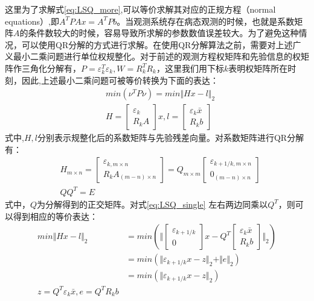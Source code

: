 这里为了求解式\eqref{eq:LSQ_more},可以等价求解其对应的正规方程（normal equations）,即\(A^{T}PAx=A^{T}Pb\)。当观测系统存在病态观测的时候，也就是系数矩阵\(A\)的条件数较大的时候，容易导致所求解的参数数值误差较大。为了避免这种情况，可以使用QR分解的方式进行求解。在使用QR分解算法之前，需要对上述广义最小二乘问题进行单位权规整化。对于前述的观测方程权矩阵和先验信息的权矩阵作三角化分解有，\(P=\varepsilon_{k}^{T}\varepsilon_{k},W=R_{k}^TR_{k}\)，这里我们用下标\(k\)表明权矩阵所在时刻，因此,上述最小二乘问题可被等价转换为下面的表达：
\begin{equation}
	\begin{aligned}
	& min(\nu^{T}P\nu) =min \Vert Hx-l \Vert_{2} \\
	& H = 
	\begin{bmatrix}
		\varepsilon_{k}\\
		R_{k}A 
	\end{bmatrix}x ,
	l = 
	\begin{bmatrix}
		\varepsilon_{k}\bar{x} \\
		R_{k}b 
	\end{bmatrix}
	\end{aligned}
	\label{eq:LSQ_single}	
\end{equation}
式中,\(H,l\)分别表示规整化后的系数矩阵与先验残差向量。对系数矩阵进行QR分解有：
\begin{equation}
	\begin{aligned}
		& H_{m \times n}=
		\begin{bmatrix}
		\varepsilon_{k,m \times n}\\
		R_{k}A_{(m-n) \times n }
		\end{bmatrix} = 
		Q_{m \times m}
		\begin{bmatrix}
		\varepsilon_{k+1/k,m \times n}\\
		0_{(m-n) \times n}
		\end{bmatrix} \\ 
		& QQ^{T}=E
	\end{aligned}
	\label{eq:QR_factor}
\end{equation}
式中，\(Q\)为分解得到的正交矩阵。对式\eqref{eq:LSQ_single} 左右两边同乘以\(Q^{T}\)，则可以得到相应的等价表达：
\begin{equation}
	\begin{aligned}
		min \Vert Hx-l \Vert_{2} & = min(\Vert
		\begin{bmatrix}
			\varepsilon_{k+1/k} \\
			0
		\end{bmatrix} x-Q^{T}
		\begin{bmatrix}
			\varepsilon_{k}\bar{x} \\
			R_{k}b 
		\end{bmatrix}
		 \Vert _{2})\\
		& = min(\Vert \varepsilon_{k+1/k}x - z \Vert_{2} +
			\Vert e \Vert_{2}
		)\\		
		& = min(\Vert \varepsilon_{k+1/k}x - z \Vert_{2}) \\
		z = Q^{T}\varepsilon_{k}\bar{x},
		e= Q^{T}R_{k}b
	\end{aligned} 
\end{equation}
